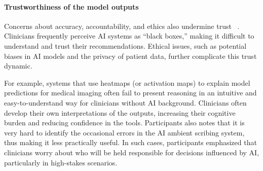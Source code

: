 \paragraph{Trustworthiness of the model outputs} 

Concerns about accuracy, accountability, and ethics also undermine trust ~\citep{HENGSTLER2016105}. 
Clinicians frequently perceive AI systems as ``black boxes,'' making it difficult to understand and trust their recommendations. 
Ethical issues, such as potential biases in AI models and the privacy of patient data, further complicate this trust dynamic.

For example, systems that use heatmaps (or activation maps) to explain model predictions for medical imaging often fail to present reasoning in an intuitive and easy-to-understand way for clinicians without AI background. 
Clinicians often develop their own interpretations of the outputs, increasing their cognitive burden and reducing confidence in the tools.
Participants also notes that it is very hard to identify the occasional errors in the AI ambient scribing system, thus making it less practically useful.
In such cases, participants emphasized that clinicians worry about who will be held responsible for decisions influenced by AI, particularly in high-stakes scenarios. 


